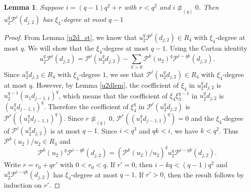 \documentclass{amsart}
\newcommand{\PP}{\mathcal{P}}
\newtheorem{lem}[subsection]{Lemma}
\begin{document}
\begin{lem}\label{special_u2d_st} 
Suppose $i=(q-1)q^{2}+r$ with $r<q^{2}$ and $i\not\equiv_{(q)}0$. 
Then $u_2^q\PP^i(d_{j,2})$ has $\xi_4$-degree at most $q-1$
\end{lem} 
\begin{proof} From Lemma \ref{u2d_st},
we know that $u_2^q\PP^i(d_{j,2})\in R_4$ with $\xi_4$-degree at most $q$.
We will show that the $\xi_4$-degree at most $q-1$.
Using the Cartan identity
$$u_2^q\PP^i(d_{j,2})=\PP^i(u_2^qd_{j,2})-\sum_{k>0}\PP^k(u_2)^q\PP^{i-qk}(d_{j,2}).$$
Since $u_2^qd_{j,2}\in R_4$ with $\xi_4$-degree $1$, we see that $\PP^i(u_2^qd_{j,2})\in R_4$
with $\xi_4$-degree at most $q$. However, by Lemma \ref{u2dlem}, the coefficient of $\xi_4$ in $u_2^qd_{j,2}$
is $u_2^{q-1}(u_1d_{j-1,1})^q$, which means that the coefficient of 
$\xi_4\xi_3^{q-1}$ in  
 $u_2^qd_{j,2}$ is $(u_{1}^q d_{j-1,1})^q$. 
 Therefore the coefficient of $\xi_{4}^q$ in $\PP^i(u_2^qd_{j,2})$
 is $\PP^r((u_{1}^q d_{j-1,1})^q)$. 
 Since $r\not\equiv_{(q)} 0$, $\PP^r((u_{1}^q d_{j-1,1})^q)=0$
 and the $\xi_{4}$-degree of $\PP^i(u_2^qd_{j,2})$ is at most $q-1$. 
 Since $i<q^3$ and $qk<i$, we have $k<q^{2}$.
 Thus $\PP^k(u_2)/u_2\in R_{3}$ and $$\PP^k(u_2)^q\PP^{i-qk}(d_{j,2})=(\PP^k(u_2)/u_2)^q u_2^q \PP^{i-qk}(d_{j,2}).$$
 Write $r=r_0+qr'$ with $0<r_0<q$. If $r'=0$, then $i-kq<(q-1)q^{2}$ and 
 $u_2^q \PP^{i-qk}(d_{j,2})$ has $\xi_{4}$-degree at most $q-1$.
 If $r'>0$, then the result follows by induction on $r'$.
\end{proof}
\end{document}
